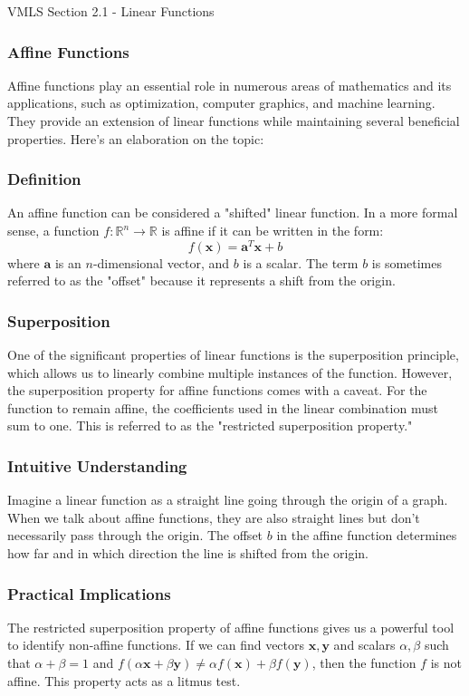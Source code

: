 \begin{notes}{VMLS Section 2.1 - Linear Functions}
    \subsubsection*{Affine Functions}
    
    Affine functions play an essential role in numerous areas of mathematics and its applications, such as optimization, computer graphics, and machine learning. They provide an extension of linear functions while maintaining several 
    beneficial properties. Here's an elaboration on the topic:
    
    \subsubsection*{Definition}
    An affine function can be considered a "shifted" linear function. In a more formal sense, a function \( f: \mathbb{R}^n \rightarrow \mathbb{R} \) is affine if it can be written in the form:
    \[ f(\mathbf{x}) = \mathbf{a}^T \mathbf{x} + b \]
    where \( \mathbf{a} \) is an \( n \)-dimensional vector, and \( b \) is a scalar. The term \( b \) is sometimes referred to as the "offset" because it represents a shift from the origin.
    
    \subsubsection*{Superposition}
    One of the significant properties of linear functions is the superposition principle, which allows us to linearly combine multiple instances of the function. However, the superposition property for affine functions comes with a 
    caveat. For the function to remain affine, the coefficients used in the linear combination must sum to one. This is referred to as the "restricted superposition property."
    
    \subsubsection*{Intuitive Understanding}
    Imagine a linear function as a straight line going through the origin of a graph. When we talk about affine functions, they are also straight lines but don't necessarily pass through the origin. The offset \( b \) in the affine 
    function determines how far and in which direction the line is shifted from the origin.
    
    \subsubsection*{Practical Implications}
    The restricted superposition property of affine functions gives us a powerful tool to identify non-affine functions. If we can find vectors \( \mathbf{x}, \mathbf{y} \) and scalars \( \alpha, \beta \) such that \( \alpha + \beta 
    = 1 \) and \( f(\alpha \mathbf{x} + \beta \mathbf{y}) \neq \alpha f(\mathbf{x}) + \beta f(\mathbf{y}) \), then the function \( f \) is not affine. This property acts as a litmus test.
    

\end{notes}
